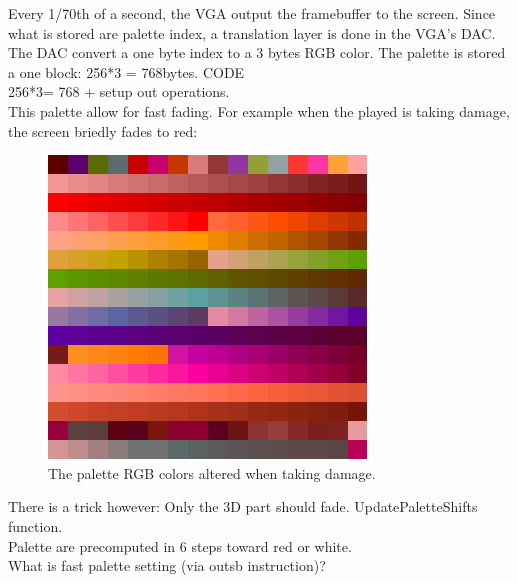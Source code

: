 Every 1/70th of a second, the VGA output the framebuffer to the screen. Since what is stored are palette index, a translation layer is done in the VGA's DAC. The DAC convert a one byte index to a 3 bytes RGB color. The palette is stored a one block: 256*3 = 768bytes. 
CODE\\
256*3= 768 + setup out operations.\\
This palette allow for fast fading. For example when the played is taking damage, the screen briedly fades to red:
\begin{figure}[H]
  \centering
 \includegraphics[width=\textwidth]{imgs/palette_damage.png}
 \caption{The palette RGB colors altered when taking damage.} \label{fig:palette_damage}
\end{figure}
There is a trick however: Only the 3D part should fade. UpdatePaletteShifts function.\\
Palette are precomputed in 6 steps toward red or white.\\
What is fast palette setting (via outsb instruction)?\\

\begin{minipage}{\linewidth}

\end{minipage}








